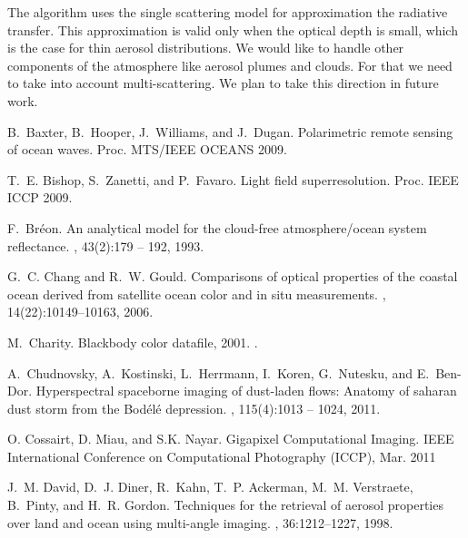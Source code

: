 \documentclass[10pt,twocolumn,letterpaper]{article}
\begin{document}
The algorithm uses the single scattering model for
approximation the radiative transfer. This approximation is valid only
when the
optical depth is small, which is the case for thin aerosol distributions.
We would like to handle other components of the atmosphere like aerosol
plumes and clouds. For that we need to take into account multi-scattering.
We plan to take this direction in future work.


{\small
%
%

\begin{thebibliography}{10}\itemsep=-1pt

B.~Baxter, B.~Hooper, J.~Williams, and J.~Dugan.
\newblock Polarimetric remote sensing of ocean waves.
\newblock Proc. MTS/IEEE OCEANS 2009.

T.~E. Bishop, S.~Zanetti, and P.~Favaro.
\newblock Light field superresolution.
Proc. IEEE ICCP 2009.

F.~Br\'{e}on.
\newblock An analytical model for the cloud-free atmosphere/ocean system
  reflectance.
, 43(2):179 -- 192, 1993.

G.~C. Chang and R.~W. Gould.
\newblock Comparisons of optical properties of the coastal ocean derived from
  satellite ocean color and in situ measurements.
, 14(22):10149--10163, 2006.

M.~Charity.
\newblock Blackbody color datafile, 2001.
.

A.~Chudnovsky, A.~Kostinski, L.~Herrmann, I.~Koren, G.~Nutesku, and E.~Ben-Dor.
\newblock Hyperspectral spaceborne imaging of dust-laden flows: Anatomy of
  saharan dust storm from the Bod\'{e}l\'{e} depression.
, 115(4):1013 -- 1024, 2011.

O. Cossairt, D. Miau, and S.K. Nayar.
\newblock Gigapixel Computational Imaging.
\newblock IEEE International Conference on Computational Photography (ICCP), Mar. 2011

J.~M. David, D.~J. Diner, R.~Kahn, T.~P. Ackerman, M.~M. Verstraete, B.~Pinty,
  and H.~R. Gordon.
\newblock Techniques for the retrieval of aerosol properties over land and
  ocean using multi-angle imaging.
,
  36:1212--1227, 1998.


\end{thebibliography}}
\end{document}
